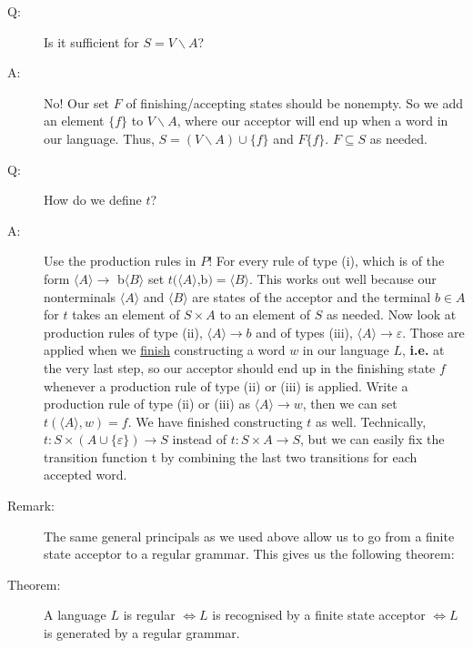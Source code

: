 \documentclass[10pt]{article}
\begin{document}
\begin{description}
		\item[Q:] Is it sufficient for $S = V \backslash A$?
		\item[A:] No! Our set $F$ of finishing/accepting states should be nonempty. So we add an element $\{f\}$ to $V \backslash A$, where our acceptor will end up when a word in our language. Thus, $S = (V \backslash A) \cup \{f\}$ and $F \{f\}$. $F \subseteq S$ as needed.
		\item[Q:] How do we define $t$?
		\item[A:] Use the production rules in $P$! For every rule of type (i), which is of the form $\langle A\rangle  \rightarrow$ b$\langle B\rangle $ set $t(\langle A\rangle $,b$) = \langle B\rangle $. This works out well because our nonterminals $\langle A\rangle $ and $\langle B\rangle $ are states of the acceptor and the terminal $b \in A$ for $t$ takes an element of $S \times A$ to an element of $S$ as needed. Now look at production rules of type (ii), $\langle A\rangle  \rightarrow b$ and of types (iii), $\langle A\rangle  \rightarrow \varepsilon$. Those are applied when we \underline{finish} constructing a word $w$ in our language $L$, \textbf{i.e.} at the very last step, so our acceptor should end up in the finishing state $f$ whenever a production rule of type (ii) or (iii) is applied. Write a production rule of type (ii) or (iii) as $\langle A\rangle  \rightarrow w$, then we can set $t(\langle A\rangle , w) = f$. We have finished constructing $t$ as well. Technically, $t:S \times (A \cup \{ \varepsilon \}) \rightarrow S$ instead of $t:S \times A \rightarrow S$, but we can easily fix the transition function t by combining the last two transitions for each accepted word.
		\item[Remark:] The same general principals as we used above allow us to go from a finite state acceptor to a regular grammar. This gives us the following theorem:
		\item[Theorem:] A language $L$ is regular $\Leftrightarrow L$ is recognised by a finite state acceptor $\Leftrightarrow L$ is generated by a regular grammar.
	\end{description}
	
\end{document}
